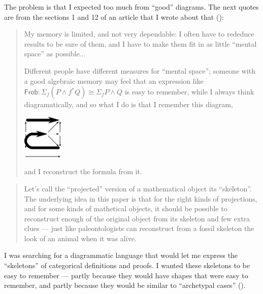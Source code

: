 \documentclass[oneside,12pt]{article}
\begin{document}
The problem is that I expected too much from ``good'' diagrams. The
next quotes are from the sections 1 and 12 of an article that I wrote
about that (\cite{IDARCT}):

\begin{quotation}

  My memory is limited, and not very dependable: I often have to
  rededuce results to be sure of them, and I have to make them fit in
  as little ``mental space'' as possible...

  Different people have different measures for ``mental space'';
  someone with a good algebraic memory may feel that an expression
  like $\mathsf{Frob}: Σ_f(P ∧ f^* Q) ≅ Σ_f P ∧ Q$ is easy to
  remember, while I always think diagramatically, and so what I do is
  that I remember this diagram,

  \begin{center}
  \includegraphics[height=60pt]{2020notes-yoneda-frob.pdf}
  \end{center}

  \noindent and I reconstruct the formula from it.

\end{quotation}

\begin{quotation}

  Let's call the ``projected'' version of a mathematical object its
  ``skeleton''. The underlying idea in this paper is that for the
  right kinds of projections, and for some kinds of mathetical
  objects, it should be possible to reconstruct enough of the original
  object from its skeleton and few extra clues --- just like
  paleontologists can reconstruct from a fossil skeleton the look of
  an animal when it was alive.

\end{quotation}

I was searching for a diagrammatic language that would let me express
the ``skeletons'' of categorical definitions and proofs. I wanted
these skeletons to be easy to remember --- partly because they would
have shapes that were easy to remember, and partly because they would
be similar to ``archetypal cases'' (\cite[section 16]{IDARCT}).

\bsk
\end{document}
